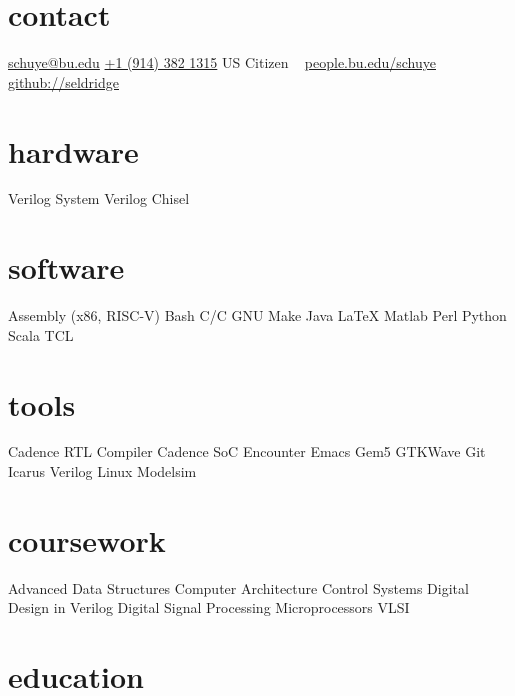 \documentclass[]{friggeri-cv} %
\begin{document}


\newcommand{\CPP}
{C\nolinebreak[4]\hspace{-.05em}\raisebox{.22ex}{\footnotesize\bf ++}}

\begin{aside} %
\section{contact}
\href{mailto:schuye@bu.edu}{schuye@bu.edu}
\href{tel:9143821315}{+1 (914) 382 1315}
US Citizen
~
\href{http://people.bu.edu/schuye}{people.bu.edu/schuye}
\href{http://github.com/seldridge}{github://seldridge}
\section{hardware}
Verilog
System Verilog
Chisel
\section{software}
Assembly (x86, RISC-V)
Bash
C/\CPP
GNU Make
Java
\LaTeX
Matlab
Perl
Python
Scala
TCL
\section{tools}
Cadence RTL Compiler
Cadence SoC Encounter
Emacs
Gem5
GTKWave
Git
Icarus Verilog
Linux
Modelsim
\section{coursework}
Advanced Data Structures
Computer Architecture
Control Systems
Digital Design in Verilog
Digital Signal Processing
Microprocessors
VLSI
\end{aside}


\section{education}
\end{document}
